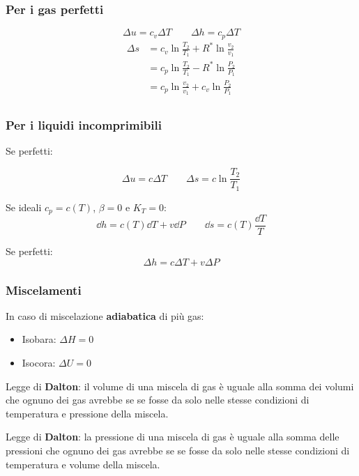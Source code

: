 \subsubsection{Per i gas perfetti}
\[ \Delta u = c_v \Delta T \qquad \Delta h = c_p \Delta T \]
\begin{align*}
    \Delta s &= c_v \ln{\frac{T_2}{T_1}} + R^*\ln{\frac{v_2}{v_1}} \\
    &= c_p \ln{\frac{T_2}{T_1}} - R^*\ln{\frac{P_2}{P_1}} \\
    &= c_p \ln{\frac{v_2}{v_1}} + c_v\ln{\frac{P_2}{P_1}} \\
\end{align*}

\subsubsection{Per i liquidi incomprimibili}

Se perfetti:

\[ \Delta u = c \Delta T \qquad \Delta s = c \ln{\frac{T_2}{T_1}} \]

Se ideali $c_p = c(T)$, $\beta = 0$ e $K_T = 0$:
\[ \dd{h} = c(T)\dd{T} + v\dd{P} \qquad \dd{s} = c(T)\frac{\dd{T}}{T} \]

Se perfetti:
\[ \Delta h = c\Delta T + v \Delta P \]

\subsubsection{Miscelamenti}
In caso di miscelazione \textbf{adiabatica} di più gas:
\begin{itemize}
    \item Isobara: $\Delta H = 0$
    \item Isocora: $\Delta U = 0$
\end{itemize}

Legge di \textbf{Dalton}: il volume di una miscela di gas è uguale alla somma dei volumi che ognuno dei gas avrebbe se se fosse da solo nelle stesse condizioni di temperatura e pressione della miscela.

Legge di \textbf{Dalton}: la pressione di una miscela di gas è uguale alla somma delle pressioni che ognuno dei gas avrebbe se se fosse da solo nelle stesse condizioni di temperatura e volume della miscela.
